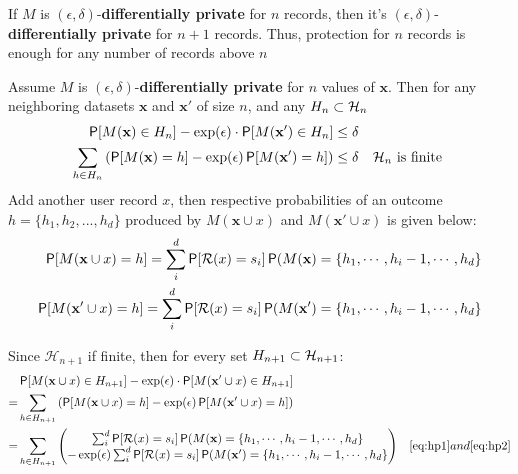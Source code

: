 \documentclass[11pt]{article}
\newcommand{\bbx}{\pmb{x}}
\newcommand{\cR}{\mathcal{R}}
\newcommand{\Hsp}{\mathcal{H}}
\newcommand{\xv}{\mathbf{x}}
\begin{document}
\begin{prop} \label{prop:nprot} If $M$ is $(\epsilon,\delta)$-\textbf{differentially private} for $n$ records, then it's $(\epsilon,\delta)$-\textbf{differentially private} for $n+1$ records. Thus, protection for $n$ records is enough for any number of records above $n$

Assume  $M$ is  $(\epsilon,\delta)$-\textbf{differentially private} for $n$ values of $\bbx$. Then for any neighboring datasets $\bbx$ and $\bbx'$ of size $n$, and any $H_n \cont \Hsp_n$
 \begin{align}
 \P[M(\xv) \in H_n] - \exp(\epsilon) \cdot \P[M(\xv') \in H_n]  \le \delta &  & \\
 \sum_{h \in H_n} \left ( \P[M(\xv) = h] -  \exp(\epsilon)  \P[M(\xv') = h]  \right )  \le \delta  &  & \Hsp_n \text{ is finite }  \label{eq:histdiff}
\end{align}
Add another user record $x$, then respective probabilities of an outcome $h=\{h_1, h_2, ..., h_d\}$ produced by $M(\xv \cup x)$ and $M(\xv' \cup x)$ is given below:
 \begin{align}
\P[M(\xv \cup x) = h] = \sum^d_i \P[\cR(x) = s_i]\P(M(\xv) = \{h_1 , \cdots ,h_i -1, \cdots, h_d \} \label{eq:hp1} \\
\P[M(\xv' \cup x) = h] = \sum^d_i \P[\cR(x) = s_i]\P(M(\xv') = \{h_1 , \cdots ,h_i -1, \cdots, h_d \} \label{eq:hp2}
\end{align}

Since $ \Hsp_{n+1}$ if finite, then for every set $H_{n+1} \cont  \Hsp_{n+1}$:
 \begin{align*}
 & \P[M(\xv \cup x) \in H_{n+1}] - \exp(\epsilon) \cdot \P[M(\xv' \cup x) \in H_{n+1}]  & \\
 = & \sum_{h \in H_{n+1}} \left ( \P[M(\xv \cup x) = h] -  \exp(\epsilon)  \P[M(\xv' \cup x) = h]  \right )  & \\
 =  & \sum_{h \in H_{n+1}}   \left (    \begin{matrix}
\sum^d_i \P[\cR(x) = s_i]\P(M(\xv) = \{h_1 , \cdots ,h_i -1, \cdots, h_d \}  \\ 
 -  \exp(\epsilon)\sum^d_i \P[\cR(x) = s_i]\P(M(\xv') = \{h_1 , \cdots ,h_i -1, \cdots, h_d \}   
\end{matrix}
  \right) &  \eqref{eq:hp1}  and  \eqref{eq:hp2} 
\end{align*}


\end{prop}
\end{document}
